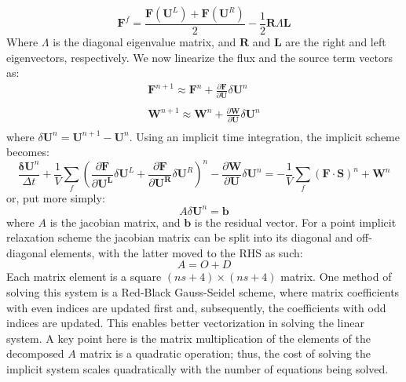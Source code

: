 \documentclass[]{aiaa-tc}%
\begin{document}
%
\begin{equation}
	\mathbf{F}^f=\frac{\mathbf{F}(\mathbf{U}^L)+\mathbf{F}(\mathbf{U}^R)}{2}-\frac{1}{2}\mathbf{R}\Lambda \mathbf{L}
\end{equation}
%
Where $\Lambda$ is the diagonal eigenvalue matrix, and $\mathbf{R}$ and $\mathbf{L}$ are the right and left eigenvectors, respectively.  We now linearize the flux and the source term vectors as:
%
\begin{equation}
	\begin{matrix}
		\mathbf{F}^{n+1} \approx \mathbf{F}^n+\frac{\partial \mathbf{F}}{\partial \mathbf{U}}\delta\mathbf{U}^n \\
		\\
		\mathbf{W}^{n+1} \approx \mathbf{W}^n+\frac{\partial \mathbf{W}}{\partial \mathbf{U}}\delta\mathbf{U}^n \\
	\end{matrix}
\end{equation}
%
where $\delta\mathbf{U}^n = \mathbf{U}^{n+1}- \mathbf{U}^{n}$.  Using an implicit time integration, the implicit scheme becomes:
%
\begin{equation}
	\frac{\mathbf{\delta U}^n}{\Delta t}+\frac{1}{V}\sum\limits_{f}(\frac{\partial \mathbf{F}}{\partial \mathbf{U^L}}\delta\mathbf{U}^L
	+\frac{\partial \mathbf{F}}{\partial \mathbf{U^R}}\delta\mathbf{U}^R)^n - \frac{\partial \mathbf{W}}{\partial \mathbf{U}}\delta\mathbf{U}^n
	= -\frac{1}{V}\sum\limits_{f}(\mathbf{F}\cdot\mathbf{S})^n + \mathbf{W}^n
\end {equation}
%
or, put more simply:
%
\begin{equation}
	A\delta\mathbf{U}^n = \mathbf{b}
\end{equation}
%
where $A$ is the jacobian matrix, and $\mathbf{b}$ is the residual vector.  For a point implicit relaxation scheme the jacobian matrix can be split into its diagonal and off-diagonal elements, with the latter moved to the RHS as such:
%
\begin{equation}
\label{decomp_jac}
	A=O+D
\end{equation}
%
Each matrix element is a square $(ns+4)\times(ns+4)$ matrix.  One method of solving this system is a Red-Black Gauss-Seidel scheme, where matrix coefficients with even indices are updated first and, subsequently, the coefficients with odd indices are updated.  This enables better vectorization in solving the linear system.  A key point here is the matrix multiplication of the elements of the decomposed $A$ matrix is a quadratic operation; thus, the cost of solving the implicit system scales quadratically with the number of equations being solved.
\end{document}
